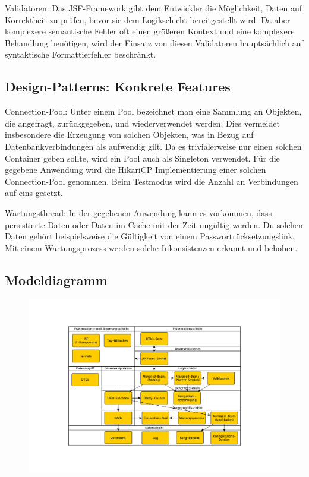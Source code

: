\documentclass{article}
\begin{document}
Validatoren: Das JSF-Framework gibt dem Entwickler die Möglichkeit, Daten auf Korrektheit zu prüfen, bevor sie dem Logikschicht bereitgestellt wird. Da aber komplexere semantische Fehler oft einen größeren Kontext und eine komplexere Behandlung benötigen, wird der Einsatz von diesen Validatoren hauptsächlich auf syntaktische Formattierfehler beschränkt. 

\subsection{Design-Patterns: Konkrete Features}

Connection-Pool: Unter einem Pool bezeichnet man eine Sammlung an Objekten, die angefragt, zurückgegeben, und wiederverwendet werden. Dies vermeidet insbesondere die Erzeugung von solchen Objekten, was in Bezug auf Datenbankverbindungen als aufwendig gilt. Da es trivialerweise nur einen solchen Container geben sollte, wird ein Pool auch als Singleton verwendet. Für die gegebene Anwendung wird die HikariCP Implementierung einer solchen Connection-Pool genommen. Beim Testmodus wird die Anzahl an Verbindungen auf eins gesetzt. \vspace{0.5em}

Wartungsthread: In der gegebenen Anwendung kann es vorkommen, dass persistierte Daten oder Daten im Cache mit der Zeit ungültig werden. Du solchen Daten gehört beispielsweise die Gültigkeit von einem Passwortrücksetzungslink. Mit einem Wartungsprozess werden solche Inkonsistenzen erkannt und behoben.

\subsection{Modeldiagramm}

\begin{figure}[h]
	\centering
	\includegraphics[width = 50em]{Modeldiagramm}
\end{figure}
\end{document}
